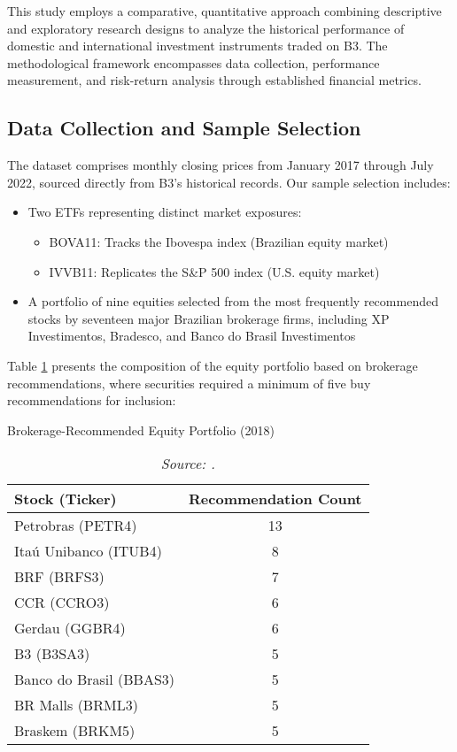 \documentclass{article}
\begin{document}
This study employs a comparative, quantitative approach combining descriptive and exploratory research designs to analyze the historical performance of domestic and international investment instruments traded on B3. The methodological framework encompasses data collection, performance measurement, and risk-return analysis through established financial metrics.

\subsection{Data Collection and Sample Selection}
The dataset comprises monthly closing prices from January 2017 through July 2022, sourced directly from B3's historical records. Our sample selection includes:

\begin{itemize}
    \item Two ETFs representing distinct market exposures:
    \begin{itemize}
        \item BOVA11: Tracks the Ibovespa index (Brazilian equity market)
        \item IVVB11: Replicates the S\&P 500 index (U.S. equity market)
    \end{itemize}
    \item A portfolio of nine equities selected from the most frequently recommended stocks by seventeen major Brazilian brokerage firms, including XP Investimentos, Bradesco, and Banco do Brasil Investimentos \citep{Almeida_2018}
\end{itemize}

Table \ref{tab:brokerage_recs} presents the composition of the equity portfolio based on brokerage recommendations, where securities required a minimum of five buy recommendations for inclusion:

\begin{table}[h]
\centering
\caption{Brokerage-Recommended Equity Portfolio (2018)}
\label{tab:brokerage_recs}
\begin{tabular}{lc}
\hline
Stock (Ticker) & Recommendation Count \\ \hline
Petrobras (PETR4) & 13 \\
Itaú Unibanco (ITUB4) & 8 \\
BRF (BRFS3) & 7 \\
CCR (CCRO3) & 6 \\
Gerdau (GGBR4) & 6 \\
B3 (B3SA3) & 5 \\
Banco do Brasil (BBAS3) & 5 \\
BR Malls (BRML3) & 5 \\
Braskem (BRKM5) & 5 \\ \hline
\end{tabular}
\vspace{0.4cm}
\caption*{\textit{Source: \citet{Almeida_2018}.}}
\end{table}
\end{document}
